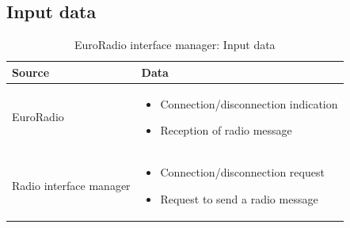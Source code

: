 \documentclass[nocc]{template/openetcs_report}
\begin{document}
\subsection{Input data}
			\begin{longtable}{|l|l|}
				\caption{EuroRadio interface manager: Input data}\\ 
				\hline
				
					\begin{minipage}[t]{0.35\linewidth} \textbf{Source}	\end{minipage} 
				&	\begin{minipage}[t]{0.65\linewidth} \textbf{Data} \end{minipage} \\
				
				\hline
																																									
					\begin{minipage}[t]{0.35\linewidth} EuroRadio	\end{minipage} 
				&	\begin{minipage}[t]{0.65\linewidth}
						\begin{itemize}
							\item Connection/disconnection indication
							\item Reception of radio message
						\end{itemize}
					\end{minipage} \\
				
				\hline
				
					\begin{minipage}[t]{0.35\linewidth} Radio interface manager	\end{minipage} 
				&	\begin{minipage}[t]{0.65\linewidth}
						\begin{itemize}
							\item Connection/disconnection request
							\item Request to send a radio message
						\end{itemize}			
					\end{minipage} \\
				
				\hline	
			\end{longtable}	
\end{document}
